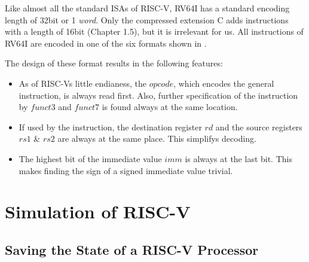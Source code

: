 Like almost all the standard ISAs of RISC-V, RV64I has a standard encoding
length of 32bit or 1 \emph{word}. Only the compressed extension C adds
instructions with a length of 16bit \cite{riscv-isa}(Chapter 1.5), but it is
irrelevant for us. All instructions of RV64I are encoded in one of the six
formats shown in .



The design of these format
results in the following features:
\begin{itemize}
    \item As of RISC-Vs little endianess, the $opcode$, which encodes the general
          instruction, is always read first. Also, further specification of the
          instruction by $funct3$ and $funct7$ is found always at the same location.
    \item If used by the instruction, the destination register $rd$ and the source
          registers $rs1$ \& $rs2$ are always at the same place. This simplifys decoding.
    \item The highest bit of the immediate value $imm$ is always at the last bit. This
          makes finding the sign of a signed immediate value trivial.
\end{itemize}

\section{Simulation of RISC-V}

\subsection{Saving the State of a RISC-V Processor}\label{statefile}